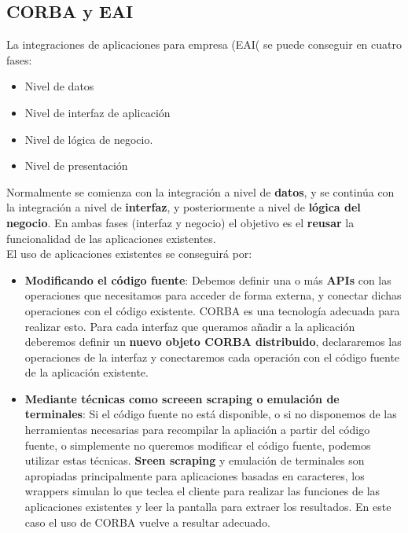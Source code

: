 \documentclass[
	12pt, %
	fleqn, %
	a4paper, %
	oneside, %
]{LegrandOrangeBook}
\begin{document}
\subsection{CORBA y EAI}
La integraciones de aplicaciones para empresa (EAI( se puede conseguir en cuatro fases:
\begin{itemize}
\item Nivel de datos
\item Nivel de interfaz de aplicación
\item Nivel de lógica de negocio.
\item Nivel de presentación
\end{itemize}
Normalmente se comienza con la integración a nivel de \textbf{datos}, y se continúa con la integración a nivel de \textbf{interfaz}, y posteriormente a nivel de \textbf{lógica del negocio}. En ambas fases (interfaz y negocio) el objetivo es el \textbf{reusar} la funcionalidad de las aplicaciones existentes.\\
El uso de aplicaciones existentes se conseguirá por:
\begin{itemize}
\item \textbf{Modificando el código fuente}: Debemos definir una o más \textbf{APIs} con las operaciones que necesitamos para acceder de forma externa, y conectar dichas operaciones con el código existente. CORBA es una tecnología adecuada para realizar esto. Para cada interfaz que queramos añadir a la aplicación deberemos definir un \textbf{nuevo objeto CORBA distribuido}, declararemos las operaciones de la interfaz y conectaremos cada operación con el código fuente de la aplicación existente.
\item \textbf{Mediante técnicas como screeen scraping o emulación de terminales}: Si el código fuente no está disponible, o si no disponemos de las herramientas necesarias para recompilar la apliación a partir del código fuente, o simplemente no queremos modificar el código fuente, podemos utilizar estas técnicas. \textbf{Sreen scraping} y emulación de terminales son apropiadas principalmente para aplicaciones basadas en caracteres, los wrappers simulan lo que teclea el cliente para realizar las funciones de las aplicaciones existentes y leer la pantalla para extraer los resultados. En este caso el uso de CORBA vuelve a resultar adecuado.
\end{itemize}
\end{document}
